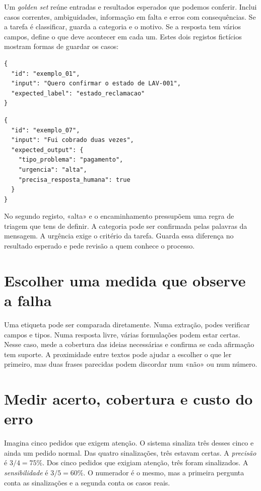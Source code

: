 Um \emph{golden set} reúne entradas e resultados esperados que podemos conferir. Inclui casos correntes, ambiguidades, informação em falta e erros com consequências. Se a tarefa é classificar, guarda a categoria e o motivo. Se a resposta tem vários campos, define o que deve acontecer em cada um. Estes dois registos fictícios mostram formas de guardar os casos:

\begin{lstlisting}
{
  "id": "exemplo_01",
  "input": "Quero confirmar o estado de LAV-001",
  "expected_label": "estado_reclamacao"
}
\end{lstlisting}

\begin{lstlisting}
{
  "id": "exemplo_07",
  "input": "Fui cobrado duas vezes",
  "expected_output": {
    "tipo_problema": "pagamento",
    "urgencia": "alta",
    "precisa_resposta_humana": true
  }
}
\end{lstlisting}

No segundo registo, «alta» e o encaminhamento pressupõem uma regra de triagem que tens de definir. A categoria pode ser confirmada pelas palavras da mensagem. A urgência exige o critério da tarefa. Guarda essa diferença no resultado esperado e pede revisão a quem conhece o processo.

\section{Escolher uma medida que observe a falha}

Uma etiqueta pode ser comparada diretamente. Numa extração, podes verificar campos e tipos. Numa resposta livre, várias formulações podem estar certas. Nesse caso, mede a cobertura das ideias necessárias e confirma se cada afirmação tem suporte. A proximidade entre textos pode ajudar a escolher o que ler primeiro, mas duas frases parecidas podem discordar num «não» ou num número.

\section{Medir acerto, cobertura e custo do erro}
\label{sec:metricas}
Imagina cinco pedidos que exigem atenção. O sistema sinaliza três desses cinco e ainda um pedido normal. Das quatro sinalizações, três estavam certas. A \emph{precisão} é $3/4=75\%$. Dos cinco pedidos que exigiam atenção, três foram sinalizados. A \emph{sensibilidade} é $3/5=60\%$. O numerador é o mesmo, mas a primeira pergunta conta as sinalizações e a segunda conta os casos reais.

